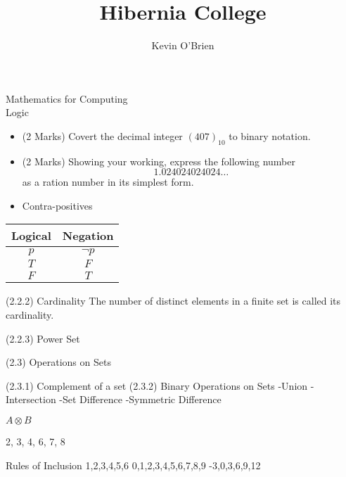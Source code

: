 \documentclass[12pt]{article} %
\title{Hibernia College}
\author{Kevin O'Brien}
\begin{document}
\begin{center}
\huge{Mathematics for Computing}\\
\LARGE{Logic}
\end{center}

\begin{itemize}
\item (2 Marks) Covert the decimal integer $(407)_{10}$ to binary notation.

\item (2 Marks) Showing your working, express the following number 
\[ 1.024024024024\ldots\]
as a ration number in its simplest form.

\end{itemize}




\begin{itemize}
\item Contra-positives
\end{itemize}



\begin{center}
\begin{tabular}{|c|c|}
Logical & Negation \\ \hline
$p$	& $\neg p$ \\ \hline
$T$	& $F$      \\ \hline
$F$	& $T$      \\ \hline
\end{tabular}
\end{center}



(2.2.2) Cardinality 
The number of distinct elements in a finite set is called its cardinality.


(2.2.3) Power Set

(2.3) Operations on Sets

(2.3.1) Complement of a set
(2.3.2) Binary Operations on Sets
-Union
-Intersection
-Set Difference
-Symmetric Difference 


$ A \otimes B$

{2, 3, 4, 6, 7, 8}

Rules of Inclusion
{1,2,3,4,5,6}
{0,1,2,3,4,5,6,7,8,9}
{-3,0,3,6,9,12}
\end{document}
